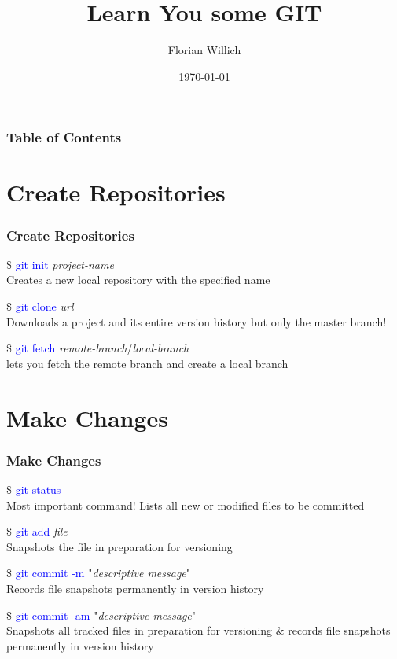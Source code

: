 \documentclass[aspectratio=169]{beamer}
\title[Learn You some GIT] %
{Learn You some GIT}
\author[Florian Willich]{Florian Willich}
\institute[BIT]
{
  Quality and Usability Lab\\
  Berlin Institute of Technology
}
\date{\today}
\begin{document}
\frame{\titlepage}

\begin{frame}
\frametitle{Table of Contents}
\tableofcontents
\end{frame}

\section{Create Repositories}
\begin{frame}

\frametitle{Create Repositories}

\$ \textcolor{blue}{git init} \textit{project-name}\\
Creates a new local repository with the specified name

\pause

\$ \textcolor{blue}{git clone} \textit{url}\\
Downloads a project and its entire version history but only the master branch!

\pause

\$ \textcolor{blue}{git fetch} \textit{remote-branch}/\textit{local-branch}\\
lets you fetch the remote branch and create a local branch

\end{frame}

\section{Make Changes}
\begin{frame}
  
\frametitle{Make Changes}

\$ \textcolor{blue}{git status}\\
Most important command! Lists all new or modified files to be committed

\pause

\$ \textcolor{blue}{git add} \textit{file}\\
Snapshots the file in preparation for versioning

\pause

\$ \textcolor{blue}{git commit -m} "\textit{descriptive message}"\\
Records file snapshots permanently in version history

\pause

\$ \textcolor{blue}{git commit -am} "\textit{descriptive message}"\\
Snapshots all tracked files in preparation for versioning \& records file snapshots permanently in version history

\end{frame}
\end{document}
